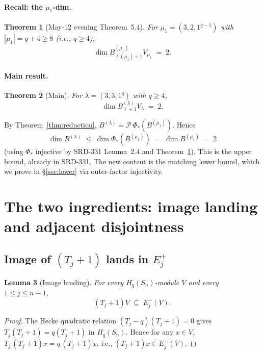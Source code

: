 \documentclass[11pt]{article}
\newtheorem{theorem}{Theorem}
\newtheorem{lemma}[theorem]{Lemma}
\theoremstyle{definition}
\begin{document}
\paragraph{Recall: the $\mu_1$-dim.}
\begin{theorem}[May-12 evening Theorem~5.4]\label{thm:mu1}
For $\mu_1 = (3, 2, 1^{q-1})$ with $|\mu_1| = q + 4 \ge 8$
(i.e., $q \ge 4$),
\[
   \dim B^{(\mu_1)}_{\ell(\mu_1)+1} V_{\mu_1} \;=\; 2.
\]
\end{theorem}

\paragraph{Main result.}
\begin{theorem}[Main]\label{thm:main}
For $\lambda = (3, 3, 1^q)$ with $q \ge 4$,
\begin{equation}\label{eq:main}
   \dim B_{\ell+1}^{(\lambda)} V_\lambda \;=\; 2.
\end{equation}
\end{theorem}

By Theorem~\ref{thm:reduction}, $B^{(\lambda)} = \mathcal{P}\,
\Phi_*(B^{(\mu_1)})$. Hence
\[
   \dim B^{(\lambda)} \;\le\; \dim \Phi_*(B^{(\mu_1)})
   \;=\; \dim B^{(\mu_1)} \;=\; 2
\]
(using $\Phi_*$ injective by SRD-331 Lemma~2.4 and Theorem~\ref{thm:mu1}). This is the
upper bound, already in SRD-331. The new content is the matching
lower bound, which we prove in \S\ref{sec:lower} via outer-factor
injectivity.

\section{The two ingredients: image landing and adjacent disjointness}\label{sec:ingredients}

\subsection{Image of $(T_j+1)$ lands in $E_j^+$}

\begin{lemma}[Image landing]\label{lem:image-land}
For every $H_q(S_n)$-module $V$ and every $1 \le j \le n - 1$,
\[
   (T_j + 1) V \;\subseteq\; E_j^+(V).
\]
\end{lemma}

\begin{proof}
The Hecke quadratic relation $(T_j - q)(T_j + 1) = 0$ gives
$T_j(T_j + 1) = q(T_j + 1)$ in $H_q(S_n)$. Hence for any $x \in V$,
$T_j\,(T_j+1)x = q\,(T_j+1)x$, i.e., $(T_j+1)x \in E_j^+(V)$.
\end{proof}
\end{document}
